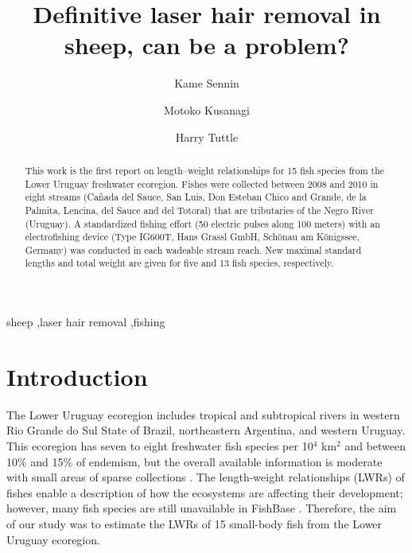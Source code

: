\documentclass[authoryear,preprint,review,12pt]{elsarticle} %
\begin{document}
\doublespacing
\linenumbers
\begin{frontmatter}

\title{Definitive laser hair removal in sheep, can be a problem?}

\author[label1]{Kame Sennin}
\author[label2]{Motoko Kusanagi}
\author[label1]{Harry Tuttle} %



\address[label1]{Hipster Sciences, Star Command University, 12th~House, Route 50, Colonia, Uruguay.}

\address[label2]{Osaka University of Arts, Osaka,  Japan.}


\begin{abstract}

This work is the first report on length--weight relationships for 15 fish species from the Lower Uruguay freshwater ecoregion. Fishes were collected between 2008 and 2010 in eight streams (Ca\~{n}ada del Sauce, San Luis, Don Esteban Chico and Grande, de la Palmita, Lencina, del Sauce and del Totoral) that are tributaries of the Negro River (Uruguay). A standardized fishing effort (50 electric pulses along 100 meters) with an electrofishing device (Type IG600T, Hans Grassl GmbH, Sch\"{o}nau am K\"{o}nigssee, Germany) was conducted in each wadeable stream reach. New maximal standard lengths and total weight are given for five and 13 fish species, respectively.
\end{abstract}

\begin{keyword}
sheep \sep laser hair removal \sep fishing

\end{keyword}

\end{frontmatter}


\section{ Introduction}

The Lower Uruguay ecoregion includes tropical and subtropical rivers in western Rio Grande do Sul State of Brazil, northeastern Argentina, and western Uruguay. This ecoregion has seven to eight freshwater fish species per 10${}^{4}$ km${}^{2}$ and between 10\% and 15\% of endemism, but the overall available information is moderate with small areas of sparse collections \citep{abell_freshwater_2008}. The length-weight relationships (LWRs) of fishes enable a description of how the ecosystems are affecting their development; however, many fish species are still unavailable in FishBase \citep{froese2016d}. Therefore, the aim of our study was to estimate the LWRs of 15 small-body fish from the Lower Uruguay ecoregion.
\end{document}
